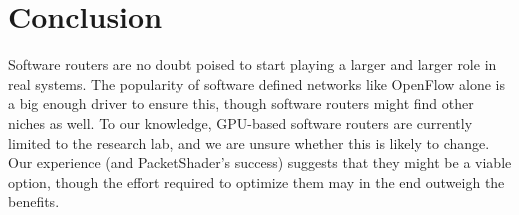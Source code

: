 \section{Conclusion}
\label{sec:concl}

Software routers are no doubt poised to start playing a larger and larger role
in real systems. The popularity of software defined networks like OpenFlow
alone is a big enough driver to ensure this, though software routers might
find other niches as well. To our knowledge, GPU-based software routers are
currently limited to the research lab, and we are unsure whether this is likely
to change. Our experience (and PacketShader's success) suggests that they might
be a viable option, though the effort required to optimize them may in the end
outweigh the benefits.
